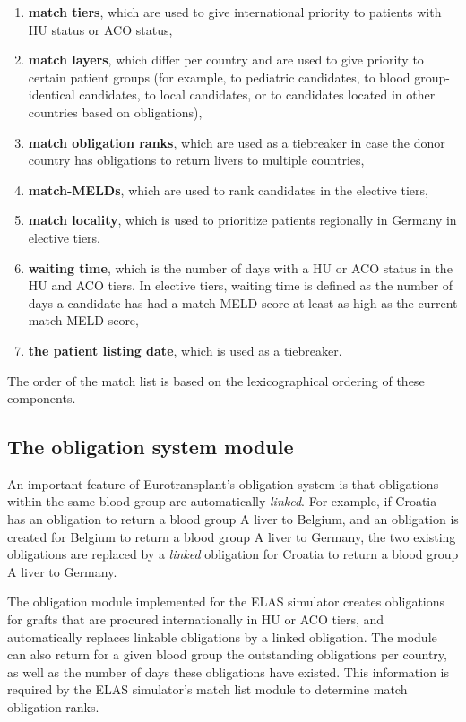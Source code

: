 \documentclass[11pt,twoside,]{book}
\providecommand{\tightlist}{%
  \setlength{\itemsep}{0pt}\setlength{\parskip}{0pt}}
\begin{document}
\begin{enumerate}
\def\labelenumi{\arabic{enumi}.}
\tightlist
\item
  \textbf{match tiers}, which are used to give international
  priority to patients with HU status or ACO status,
\item
  \textbf{match layers}, which differ per country and are used to give
  priority to certain patient groups (for example, to pediatric
  candidates, to blood group-identical candidates, to local
  candidates, or to candidates located in other countries based on
  obligations),
\item
  \textbf{match obligation ranks}, which are used as a tiebreaker in case
  the donor country has obligations to return livers to multiple
  countries,
\item
  \textbf{match-MELDs}, which are used to rank candidates in the elective
  tiers,
\item
  \textbf{match locality}, which is used to prioritize patients regionally
  in Germany in elective tiers,
\item
  \textbf{waiting time}, which is the number of days with a HU or ACO status
  in the HU and ACO tiers. In elective tiers, waiting time is defined as the
  number of days a candidate has had a match-MELD score at least as high
  as the current match-MELD score,
\item
  \textbf{the patient listing date}, which is used as a tiebreaker.
\end{enumerate}

The order of the match list is based on the lexicographical ordering of these
components.

\subsection{The obligation system module}\label{sec:elasobligations}

An important feature of Eurotransplant's obligation system is that
obligations within the same blood group are automatically \emph{linked}. For
example, if Croatia has an obligation to return a blood group A
liver to Belgium, and an obligation is created for Belgium to return a
blood group A liver to Germany, the two existing obligations are
replaced by a \emph{linked} obligation for Croatia to return a blood
group A liver to Germany.

The obligation module implemented for the ELAS simulator creates obligations
for grafts that are procured internationally in HU or ACO tiers, and automatically
replaces linkable obligations by a linked obligation. The module can also return
for a given blood group the outstanding obligations per country,
as well as the number of days these
obligations have existed. This information is required by the ELAS
simulator's match list module to determine match obligation ranks.
\end{document}
